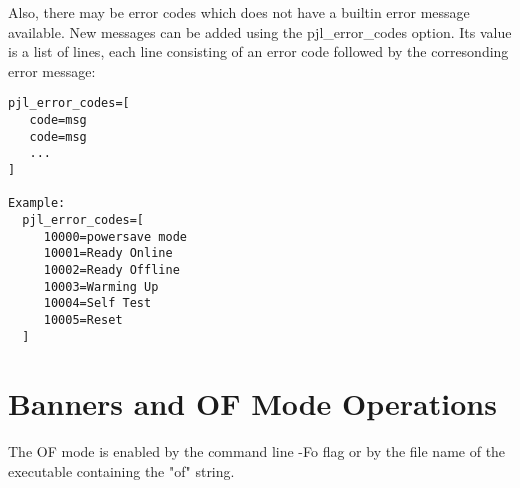 \documentclass[a4paper]{article}
\begin{document}
Also, there may be error codes which does not have a builtin error
message available.  New messages can be added using the
{\ttfamily pjl\_error\_codes}
option.
Its value is a list of lines, each line consisting of an error code
followed by the corresonding error message:
\begin{tscreen}
\begin{verbatim}
pjl_error_codes=[
   code=msg
   code=msg
   ...
]

Example:
  pjl_error_codes=[
     10000=powersave mode
     10001=Ready Online
     10002=Ready Offline
     10003=Warming Up
     10004=Self Test
     10005=Reset
  ]
\end{verbatim}
\end{tscreen}



\section{Banners and OF Mode Operations
\label{banner}
\label{banner_file}
\label{page_width}
\label{page_length}}

The OF mode is enabled by the command line -Fo flag or by
the file name of the executable containing the "of" string.
\end{document}
